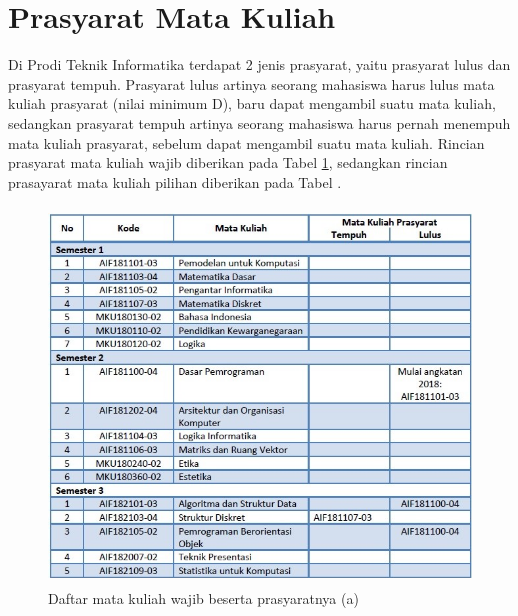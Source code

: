 \newpage
\section{Prasyarat Mata Kuliah}
Di Prodi Teknik Informatika terdapat 2 jenis prasyarat, yaitu prasyarat lulus dan prasyarat tempuh. Prasyarat lulus artinya seorang mahasiswa harus lulus mata kuliah prasyarat (nilai minimum D), baru dapat mengambil suatu mata kuliah, sedangkan prasyarat tempuh artinya seorang mahasiswa harus pernah menempuh mata kuliah prasyarat, sebelum dapat mengambil suatu mata kuliah. Rincian prasyarat mata kuliah wajib diberikan pada Tabel \ref{fig:gambar8}, sedangkan rincian prasayarat mata kuliah pilihan diberikan pada Tabel .

\begin{figure}[H]
    \centering
    \includegraphics[width=12cm, height=10cm]{Gambar/Prasyarat MK Wajib 1.jpg}
    \caption{Daftar mata kuliah wajib beserta prasyaratnya (a)}
    \label{fig:gambar8}
\end{figure}

